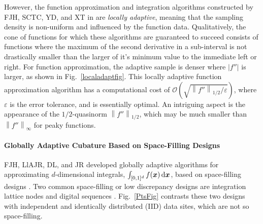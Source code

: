 \documentclass[11pt]{NSFamsart}
\newcommand{\bx}{{\boldsymbol{x}}}
\def\dif{\textup{d}}
\def\abs#1{\ensuremath{\left \lvert #1 \right \rvert}}
\newcommand{\norm}[2][{}]{\ensuremath{\left \lVert #2 \right \rVert}_{#1}}
\newcommand{\Order}{\mathcal{O}}
\begin{document}
However, the function approximation and integration algorithms constructed by FJH, SCTC, YD, and XT in \cite{ChoEtal17a} are \emph{locally adaptive}, meaning that the sampling density is non-uniform and influenced by the function data.  Qualitatively, the cone of functions for which these algorithms are guaranteed to succeed consists of functions where the maximum of the second derivative in a sub-interval is not drastically smaller than the larger of it's minimum value to the immediate left or right.  For function approximation, the adaptive sample is denser where $\abs{f''}$ is larger, as shown in Fig.\ \ref{localadaptfig}.  This locally adaptive function approximation algorithm has a computational cost of $\Order\left(\sqrt{\norm[1/2]{f''}/\varepsilon} \right)$, where $\varepsilon$ is the error tolerance, and is essentially optimal.  An intriguing aspect is the appearance of the $1/2$-quasinorm $\norm[1/2]{f''}$, which may be much smaller than 
$\norm[\infty]{f''}$ for peaky functions.



\paragraph*[QMCsec]{Globally Adaptive Cubature Based on Space-Filling Designs} \hypertarget{QMClink}{}
\label{sec:QMC}

FJH, LlAJR, DL, and JR developed globally adaptive algorithms for approximating $d$-dimensional integrals,  $\int_{[0,1]^d} f(\bx) \, \dif \bx$, based on space-filling designs \cite{HicJim16a,HicEtal17a,JimHic16a}.  Two common space-filling or low discrepancy designs are integration lattice nodes and digital sequences \cite{DicEtal14a}.  Fig.\ \ref{PtsFig} contrasts these two designs with independent and identically distributed (IID) data sites, which are not so space-filling.
\end{document}
